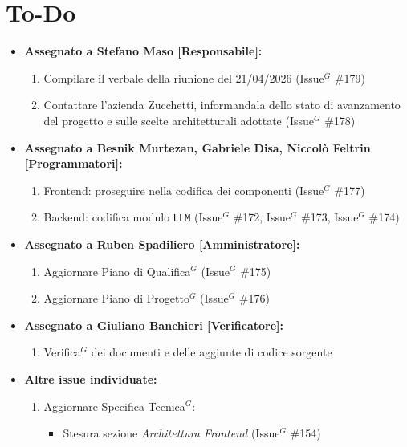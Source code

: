 \documentclass[a4paper,10pt]{article}
\begin{document}
\section*{To-Do}
\begin{itemize}
\item \textbf{Assegnato a Stefano Maso [Responsabile]:}
    \begin{enumerate}
    \item Compilare il verbale della riunione del 21/04/2026 (Issue$^G$ \#179)
    \item Contattare l'azienda Zucchetti, informandala dello stato di avanzamento del progetto e sulle scelte architetturali adottate (Issue$^G$ \#178)
    \end{enumerate}
\item \textbf{Assegnato a Besnik Murtezan, Gabriele Disa, Niccolò Feltrin [Programmatori]:}
    \begin{enumerate}
    \item Frontend: proseguire nella codifica dei componenti (Issue$^G$ \#177)
    \item Backend: codifica modulo \texttt{LLM} (Issue$^G$ \#172, Issue$^G$ \#173, Issue$^G$ \#174)
  \end{enumerate}
\item \textbf{Assegnato a Ruben Spadiliero [Amministratore]:}
    \begin{enumerate}
    \item Aggiornare Piano di Qualifica$^G$ (Issue$^G$ \#175)
    \item Aggiornare Piano di Progetto$^G$ (Issue$^G$ \#176)
    \end{enumerate}
\item \textbf{Assegnato a Giuliano Banchieri [Verificatore]:}
    \begin{enumerate}
    \item Verifica$^G$ dei documenti e delle aggiunte di codice sorgente
    \end{enumerate}
\item \textbf{Altre issue individuate:}
    \begin{enumerate}
    \item Aggiornare Specifica Tecnica$^G$:
      \begin{itemize}
        \item Stesura sezione \textit{Architettura Frontend} (Issue$^G$ \#154)
      \end{itemize}
    \end{enumerate}
\end{itemize}
\end{document}
